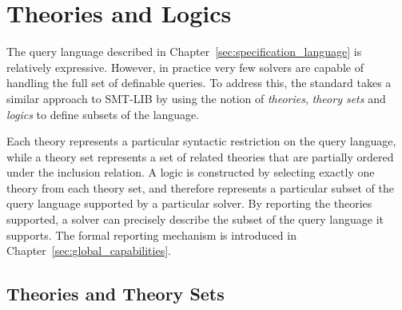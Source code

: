    

\chapter{Theories and Logics}
\label{sec:theories-logics}

The query language described in Chapter~\ref{sec:specification_language} is relatively expressive. However, in practice very few solvers are capable of handling the full set of definable queries.  To address this, the \vnnlib{} standard takes a similar approach to SMT-LIB by using the notion of \emph{theories}, \emph{theory sets} and \emph{logics} to define subsets of the language.

Each theory represents a particular syntactic restriction on the query language, while a theory set represents a set of related theories that are partially ordered under the inclusion relation. A logic is constructed by selecting exactly one theory from each theory set, and therefore represents a particular subset of the query language supported by a particular solver. 
By reporting the theories supported, a solver can precisely describe the subset of the query language it supports. The formal reporting mechanism is introduced in Chapter~\ref{sec:global_capabilities}.

\section{Theories and Theory Sets}

